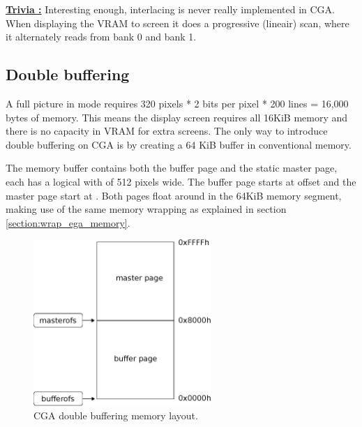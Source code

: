 \documentclass[book.tex]{subfiles}
\begin{document}
\par
\textbf{\underline{Trivia :}} Interesting enough, interlacing is never really implemented in CGA. When displaying the VRAM to screen it does a progressive (lineair) scan, where it alternately reads from bank 0 and bank 1.\\
\par


\subsection{Double buffering}
A full picture in mode  requires 320 pixels * 2 bits per pixel * 200 lines = 16,000 bytes of memory. This means the display screen requires all 16KiB memory and there is no capacity in VRAM for extra screens. The only way to introduce double buffering on CGA is by creating a 64 KiB buffer in conventional memory.  \\
\par
\begin{minipage}{\textwidth}
  
\end{minipage}
\label{state_type}
\par
The memory buffer contains both the buffer page and the static master page, each has a logical with of 512 pixels wide. The buffer page starts at offset  and the master page start at . Both pages float around in the 64KiB memory segment, making use of the same memory wrapping as explained in section \ref{section:wrap_ega_memory}.


\begin{figure}[H]
\centering
\includegraphics[width=0.6\textwidth]{imgs/drawings/cga_screenseg.eps}
\caption{CGA double buffering memory layout.}
\label{fig:cga_screenseg}
\end{figure}
\end{document}
